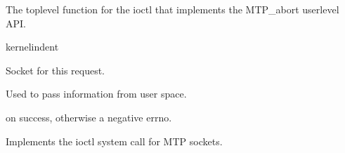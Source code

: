 \documentclass[letterpaper,10pt,english]{sphinxmanual}
\begin{document}
\begin{fulllineitems}
\label{\detokenize{mtpimpl.c:c.MTP_ioc_abort}}
\pysigstartsignatures
\pysigstartmultiline
{}
\pysigstopmultiline
\pysigstopsignatures
\sphinxAtStartPar
The top\sphinxhyphen{}level function for the ioctl that implements the MTP\_abort user\sphinxhyphen{}level API.

\end{fulllineitems}


\begin{sphinxuseclass}{kernelindent}
\sphinxAtStartPar
{}
\begin{description}
\sphinxAtStartPar
Socket for this request.

\sphinxAtStartPar
Used to pass information from user space.

\end{description}

\sphinxAtStartPar
{}

 on success, otherwise a negative errno.

\end{sphinxuseclass}

\begin{fulllineitems}
\label{\detokenize{mtpimpl.c:c.MTP_ioctl}}
\pysigstartsignatures
\pysigstartmultiline
{}
\pysigstopmultiline
\pysigstopsignatures
\sphinxAtStartPar
Implements the ioctl system call for MTP sockets.

\end{fulllineitems}
\end{document}

